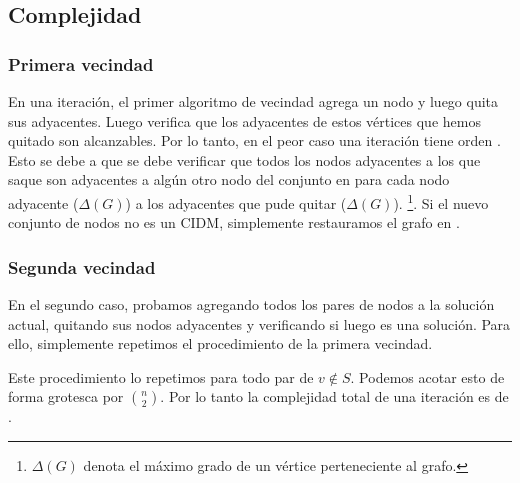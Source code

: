 \subsection{Complejidad}

\subsubsection{Primera vecindad}

En una iteración, el primer algoritmo de vecindad agrega un nodo y luego quita sus adyacentes. Luego verifica que los adyacentes de estos vértices que hemos quitado son alcanzables. Por lo tanto, en el peor caso una iteración tiene orden . Esto se debe a que se debe verificar que todos los nodos adyacentes a los que saque son adyacentes a algún otro nodo del conjunto en  para cada nodo adyacente ($\Delta(G)$) a los adyacentes que pude quitar ($\Delta(G)$). \footnote{$\Delta(G)$ denota el máximo grado de un vértice perteneciente al grafo.}. Si el nuevo conjunto de nodos no es un CIDM, simplemente restauramos el grafo en .

\subsubsection{Segunda vecindad}

En el segundo caso, probamos agregando todos los pares de nodos a la solución actual, quitando sus nodos adyacentes y verificando si luego es una solución. Para ello, simplemente repetimos el procedimiento de la primera vecindad.

Este procedimiento lo repetimos para todo par de $v \not\in S$. Podemos acotar esto de forma grotesca por $\binom{n}{2}$. Por lo tanto la complejidad total de una iteración es de .
